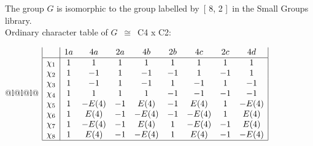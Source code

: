 \documentclass[varwidth=\maxdimen,border=10]{standalone}
\begin{document}
The group $G$ is isomorphic to the group labelled by\ [ 8, 2 ]\ in the Small Groups library.\\
Ordinary character table of $G$\ $\cong$\ C4 x C2:\\
\begin{center}
\begin{tabular}{@{}l@{}l@{}l@{}}
\hline
\(\begin{array}{|l|cccccccc|}
  & 1a & 4a & 2a & 4b & 2b & 4c & 2c & 4d\\ \hline
\chi_{1} & 1 & 1 & 1 & 1 & 1 & 1 & 1 & 1\\
\chi_{2} & 1 & -1 & 1 & -1 & -1 & 1 & -1 & 1\\
\chi_{3} & 1 & -1 & 1 & -1 & 1 & -1 & 1 & -1\\
\chi_{4} & 1 & 1 & 1 & 1 & -1 & -1 & -1 & -1\\
\chi_{5} & 1 & -E(4) & -1 & E(4) & -1 & E(4) & 1 & -E(4)\\
\chi_{6} & 1 & E(4) & -1 & -E(4) & -1 & -E(4) & 1 & E(4)\\
\chi_{7} & 1 & -E(4) & -1 & E(4) & 1 & -E(4) & -1 & E(4)\\
\chi_{8} & 1 & E(4) & -1 & -E(4) & 1 & E(4) & -1 & -E(4)\\
\hline
\end{array}\)\\
\end{tabular}
\end{center}
\end{document}
